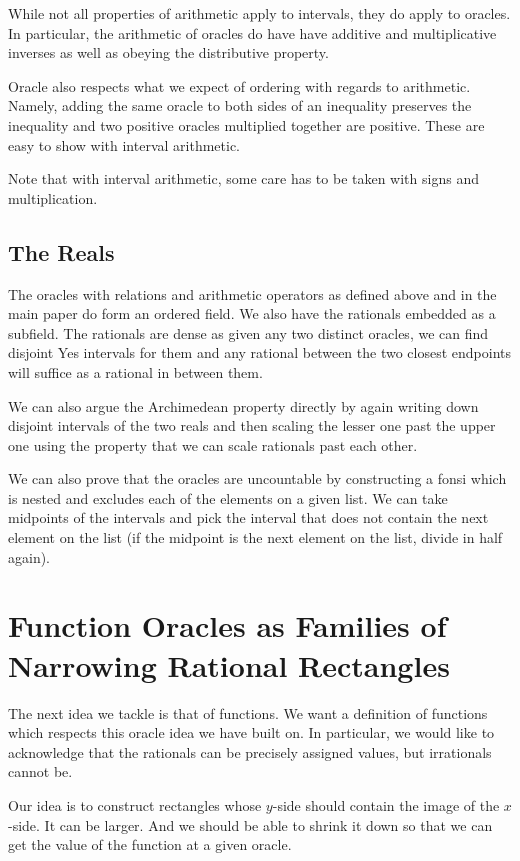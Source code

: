 \documentclass[12pt]{article}
\theoremstyle{remark}
\begin{document}
While not all properties of arithmetic apply to intervals, they do apply to oracles. In particular, the arithmetic of oracles do have have additive and multiplicative inverses as well as obeying the distributive property. 

Oracle also respects what we expect of ordering with regards to arithmetic. Namely, adding the same oracle to both sides of an inequality preserves the inequality and two positive oracles multiplied together are positive. These are easy to show with interval arithmetic. 

Note that with interval arithmetic, some care has to be taken with signs and multiplication. 

\subsection{The Reals}

The oracles with relations and arithmetic operators as defined above and in the main paper do form an ordered field. We also have the rationals embedded as a subfield. The rationals are dense as given any two distinct oracles, we can find disjoint Yes intervals for them and any rational between the two closest endpoints will suffice as a rational in between them. 

We can also argue the Archimedean property directly by again writing down disjoint intervals of the two reals and then scaling the lesser one past the upper one using the property that we can scale rationals past each other. 

We can also prove that the oracles are uncountable by constructing a fonsi which is nested and excludes each of the elements on a given list. We can take midpoints of the intervals and pick the interval that does not contain the next element on the list (if the midpoint is the next element on the list, divide in half again). 

\section{Function Oracles as Families of Narrowing Rational Rectangles}

The next idea we tackle is that of functions. We want a definition of functions which respects this oracle idea we have built on. In particular, we would like to acknowledge that the rationals can be precisely assigned values, but irrationals cannot be. 

Our idea is to construct rectangles whose $y$-side should contain the image of the $x$-side. It can be larger. And we should be able to shrink it down so that we can get the value of the function at a given oracle. 
\end{document}
